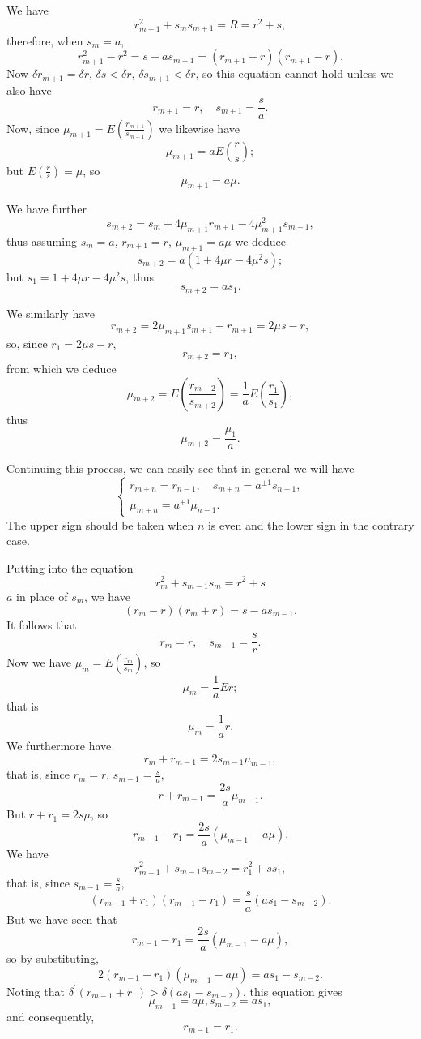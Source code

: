 \documentclass[oneside, 12 pt, leqno]{memoir}
\begin{document}
We have
\[r_{m+1}^2+s_m s_{m+1}=R=r^2+s,\]
therefore, when \(s_m=a\),
\[r_{m+1}^2-r^2=s-a s_{m+1}=\left(r_{m+1}+r\right)\left(r_{m+1}-r\right ).\]
Now \(\delta r_{m+1}=\delta r\), \(\delta s<\delta r\), \(\delta s_{m+1}<\delta r\), so this equation cannot hold unless we also have
\[r_{m+1}=r, \quad s_{m+1}=\frac{s}{a}.\]
Now, since \(\mu_{m+1}=E\left(\frac{r_{m+1}}{s_{m+1}}\right)\) we likewise have
\[\mu_{m+1}=a E\left(\frac{r}{s}\right);\]
but \(E\left(\frac{r}{s}\right)=\mu\), so
\[\mu_{m+1}=a \mu .\]

We have further
\[s_{m+2}=s_m+4 \mu_{m+1} r_{m+1}-4 \mu_{m+1}^2 s_{m+1},\]
thus assuming \(s_m=a\), \(r_{m+1}=r\), \(\mu_{m+1}=a \mu\) we deduce
\[s_{m+2}=a\left(1+4 \mu r-4 \mu^2 s\right);\]
but \(s_1=1+4 \mu r-4 \mu^2 s\), thus
\[s_{m+2}=a s_1.\]

We similarly have
\[r_{m+2}=2 \mu_{m+1} s_{m+1}-r_{m+1}=2 \mu s-r,\]
so, since \(r_1=2 \mu s-r\),
\[r_{m+2}=r_1,\]
from which we deduce
\[\mu_{m+2}=E\left(\frac{r_{m+2}}{s_{m+2}}\right)=\frac{1}{a} E\left(\frac{r_1}{s_1}\right),\]
thus
\[\mu_{m+2}=\frac{\mu_1}{a}.\]

Continuing this process, we can easily see that in general we will have
\[\tag{41}\left\{\begin{array}{l} r_{m+n}=r_{n-1}, \quad s_{m+n}=a^{\pm1} s_{n-1}, \\
\mu_{m+n}=a^{\mp 1} \mu_{n-1}. \end{array}\right.\]
The upper sign should be taken when \(n\) is even and the lower sign in the contrary case.

Putting into the equation
\[r_m^2+s_{m-1} s_m=r^2+s\]
\(a\) in place of \(s_m\), we have
\[\left(r_m-r\right)\left(r_m+r\right)=s-a s_{m-1}.\]
It follows that
\[ r_m=r, \quad s_{m-1}=\frac{s}{r}.\]
Now we have \(\mu_m=E\left(\frac{r_m}{s_m}\right)\), so
\[\mu_m=\frac{1}{a} E r;\]
that is
\[\mu_m=\frac{1}{a} r.\]
We furthermore have
\[r_m+r_{m-1}=2 s_{m-1} \mu_{m-1},\]
that is, since \(r_m=r\), \(s_{m-1}=\frac{s}{a}\),
\[r+r_{m-1}=\frac{2 s}{a} \mu_{m-1}.\]
But \(r+r_1=2 s \mu\), so
\[r_{m-1}-r_1=\frac{2 s}{a}\left(\mu_{m-1}-a \mu\right).\]
We have
\[r_{m-1}^2+s_{m-1} s_{m-2}=r_1^2+s s_1,\]
that is, since \(s_{m-1}=\frac{s}{a}\),
\[\left(r_{m-1}+r_1\right)\left(r_{m-1}-r_1\right)=\frac{s}{a}\left(a s_1-s_{m-2}\right).\]
But we have seen that
\[r_{m-1}-r_1=\frac{2 s}{a}\left(\mu_{m-1}-a \mu\right),\]
so by substituting,
\[2\left(r_{m-1}+r_1\right)\left(\mu_{m-1}-a \mu\right)=a s_1-s_{m-2}.\]
Noting that \(\delta^{\prime}\left(r_{m-1}+r_1\right)>\delta\left(a s_1-s_{m-2}\right)\), this equation gives
\[\mu_{m-1}=a \mu, s_{m-2}=a s_1,\]
and consequently,
\[r_{m-1}=r_1.\]
\end{document}
